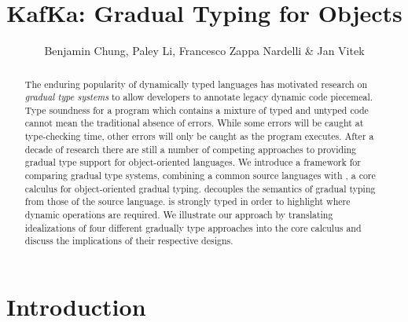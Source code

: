 \documentclass[USenglish]{tex/lipics-v2016}
\begin{document}
\title{KafKa: Gradual Typing for Objects}
\author{Benjamin Chung, Paley Li, Francesco Zappa Nardelli \& Jan Vitek}


\EventLogo{}


\maketitle

\begin{abstract} 
The enduring popularity of dynamically typed languages has motivated
research on \emph{gradual type systems} to allow developers to annotate
legacy dynamic code piecemeal. Type soundness for a program which contains a
mixture of typed and untyped code cannot mean the traditional absence of
errors. While some errors will be caught at type-checking time, other errors
will only be caught as the program executes. After a decade of research
there are still a number of competing approaches to providing gradual type
support for object-oriented languages. We introduce a framework for
comparing gradual type systems, combining a common source languages with
\kafka, a core calculus for object-oriented gradual typing.  \kafka
decouples the semantics of gradual typing from those of the source
language. \kafka is strongly typed in order to highlight where dynamic
operations are required.  We illustrate our approach by translating
idealizations of four different gradually type approaches into the core
calculus and discuss the implications of their respective designs.
\end{abstract}

\section{Introduction}
\end{document}
